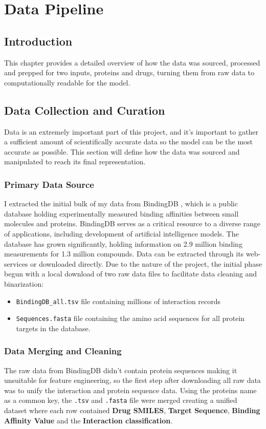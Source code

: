 \chapter{Data Pipeline}
\label{chap:data-pipeline}
\sloppy
\section{Introduction}
This chapter provides a detailed overview of how the data was sourced, processed and prepped for two inputs, proteins and drugs, turning them from raw data to computationally readable for the model.

\section{Data Collection and Curation}
Data is an extremely important part of this project, and it's important to gather a sufficient amount of scientifically accurate data so the model can be the most accurate as possible. This section will define how the data was sourced and manipulated to reach its final representation.
\subsection{Primary Data Source}
I extracted the initial bulk of my data from BindingDB \citep{bindingdb_web}, which is a public database holding experimentally measured binding affinities between small molecules and proteins. BindingDB serves as a critical resource to a diverse range of applications, including development of artificial intelligence models. The database has grown significantly, holding information on 2.9 million binding measurements for 1.3 million compounds. Data can be extracted through its web-services or downloaded directly. Due to the nature of the project, the initial phase begun with a local download of two raw data files to facilitate data cleaning and binarization: 
\begin{itemize}
    \item \texttt{BindingDB\_all.tsv} file containing millions of interaction records
    \item \texttt{Sequences.fasta} file containing the amino acid sequences for all protein targets in the database.
\end{itemize} 
\subsection{Data Merging and Cleaning}
The raw data from BindingDB didn't contain protein sequences making it unsuitable for feature engineering, so the first step after downloading all raw data was to unify the interaction and protein sequence data. Using the proteins name as a common key, the \texttt{.tsv} and \texttt{.fasta} file were merged creating a unified dataset where each row contained \textbf{Drug SMILES}, \textbf{Target Sequence}, \textbf{Binding Affinity Value} and the \textbf{Interaction classification}.

